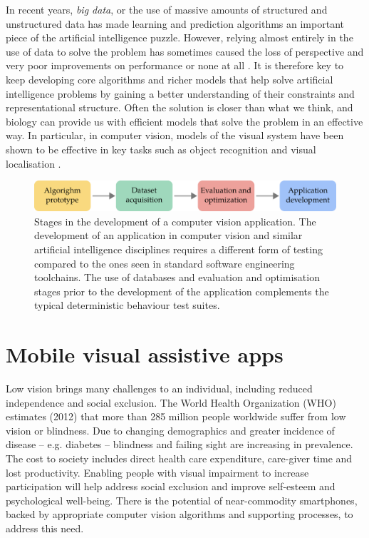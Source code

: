In recent years, \textit{big data}, or the use of massive amounts of structured and unstructured data has made learning and prediction algorithms an important piece of the artificial intelligence puzzle. However, relying almost entirely in the use of data to solve the problem has sometimes caused the loss of perspective and very poor improvements on performance or none at all \cite{zhu2012we}. It is therefore key to keep developing core algorithms and richer models that help solve artificial intelligence problems by gaining a better understanding of their constraints and representational structure. Often the solution is closer than what we think, and biology can provide us with efficient models that solve the problem in an effective way. In particular, in computer vision, models of the visual system have been shown to be effective in key tasks such as object recognition and visual localisation \cite{lowe2004distinctive,milford2004ratslam}. 


\begin{figure}
\centering
\includegraphics[width=\linewidth]{gfx/Chapter01/cv_dev_pipeline.pdf}
\caption{Stages in the development of a computer vision application. The development of an application in computer vision and similar artificial intelligence disciplines requires a different form of testing compared to the ones seen in standard software engineering toolchains. The use of databases and evaluation and optimisation stages prior to the development of the application complements the typical deterministic behaviour test suites.}
\label{fig:cv_dev_pipeline}
\end{figure}

\section{Mobile visual assistive apps}

Low vision brings many challenges to an individual, including reduced independence and social exclusion. The World Health Organization (WHO) estimates (2012) that more than 285 million people worldwide suffer from low vision or blindness. Due to changing demographics and greater incidence of disease -- e.g. diabetes -- blindness and failing sight are increasing in prevalence.  The cost to society includes direct health care expenditure, care-giver time and lost productivity.  Enabling people with visual impairment to increase participation will help address social exclusion and improve self-esteem and psychological well-being. There is the potential of near-commodity smartphones, backed by appropriate computer vision algorithms and supporting processes, to address this need.

